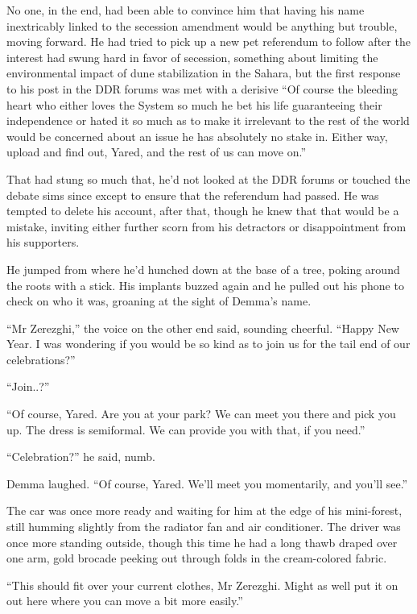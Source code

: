 No one, in the end, had been able to convince him that having his name inextricably linked to the secession amendment would be anything but trouble, moving forward. He had tried to pick up a new pet referendum to follow after the interest had swung hard in favor of secession, something about limiting the environmental impact of dune stabilization in the Sahara, but the first response to his post in the DDR forums was met with a derisive ``Of course the bleeding heart who either loves the System so much he bet his life guaranteeing their independence or hated it so much as to make it irrelevant to the rest of the world would be concerned about an issue he has absolutely no stake in. Either way, upload and find out, Yared, and the rest of us can move on.''

That had stung so much that, he'd not looked at the DDR forums or touched the debate sims since except to ensure that the referendum had passed. He was tempted to delete his account, after that, though he knew that that would be a mistake, inviting either further scorn from his detractors or disappointment from his supporters.

He jumped from where he'd hunched down at the base of a tree, poking around the roots with a stick. His implants buzzed again and he pulled out his phone to check on who it was, groaning at the sight of Demma's name.

``Mr Zerezghi,'' the voice on the other end said, sounding cheerful. ``Happy New Year. I was wondering if you would be so kind as to join us for the tail end of our celebrations?''

``Join..?''

``Of course, Yared. Are you at your park? We can meet you there and pick you up. The dress is semiformal. We can provide you with that, if you need.''

``Celebration?'' he said, numb.

Demma laughed. ``Of course, Yared. We'll meet you momentarily, and you'll see.''

The car was once more ready and waiting for him at the edge of his mini-forest, still humming slightly from the radiator fan and air conditioner. The driver was once more standing outside, though this time he had a long thawb draped over one arm, gold brocade peeking out through folds in the cream-colored fabric.

``This should fit over your current clothes, Mr Zerezghi. Might as well put it on out here where you can move a bit more easily.''

